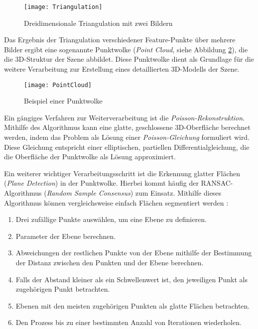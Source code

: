 \begin{figure}[ht]
    \centering
    \texttt{[image: Triangulation]}
    \caption{Dreidimensionale Triangulation mit zwei Bildern \cite{gao2021vSLAM}\label{fig:Triangulation}}\par
\end{figure}

Das Ergebnis der Triangulation verschiedener Feature-Punkte über mehrere Bilder ergibt eine sogenannte Punktwolke (\emph{Point Cloud}, siehe Abbildung \ref{fig:PointCloud}), die die 3D-Struktur der Szene abbildet. Diese Punktwolke dient als Grundlage für die weitere Verarbeitung zur Erstellung eines detaillierten 3D-Modells der Szene.

\begin{figure}[ht]
    \centering
    \texttt{[image: PointCloud]}
    \caption{Beispiel einer Punktwolke \cite{open3d2025pointcloud}\label{fig:PointCloud}}\par
\end{figure}

Ein gängiges Verfahren zur Weiterverarbeitung ist die \emph{Poisson-Rekonstruktion}. Mithilfe des Algorithmus kann eine glatte, geschlossene 3D-Oberfläche berechnet werden, indem das Problem als Lösung einer \emph{Poisson-Gleichung} formuliert wird. Diese Gleichung entspricht einer elliptischen, partiellen Differentialgleichung, die die Oberfläche der Punktwolke als Lösung approximiert. \cite{kazhdan2006poisson}

Ein weiterer wichtiger Verarbeitungsschritt ist die Erkennung glatter Flächen (\emph{Plane Detection}) in der Punktwolke. Hierbei kommt häufig der RANSAC-Algorithmus (\emph{Random Sample Consensus}) zum Einsatz. Mithilfe dieses Algorithmus können vergleichsweise einfach Flächen segmentiert werden \cite{yang2010planeDetection, ajith2020ransac}:

\begin{enumerate}
    \item Drei zufällige Punkte auswählen, um eine Ebene zu definieren.
    \item Parameter der Ebene berechnen.
    \item Abweichungen der restlichen Punkte von der Ebene mithilfe der Bestimmung der Distanz zwischen den Punkten und der Ebene berechnen.
    \item Falls der Abstand kleiner als ein Schwellenwert ist, den jeweiligen Punkt als zugehörigen Punkt betrachten.
    \item Ebenen mit den meisten zugehörigen Punkten als glatte Flächen betrachten.
    \item Den Prozess bis zu einer bestimmten Anzahl von Iterationen wiederholen.
\end{enumerate}

